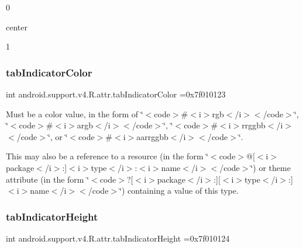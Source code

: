 0

{\ttfamily center}

1\mbox{\label{classandroid_1_1support_1_1v4_1_1R_1_1attr_a75cc391c8e9b6a17ccd48f0d7c092d01}} 
\subsubsection{\texorpdfstring{tab\+Indicator\+Color}{tabIndicatorColor}}
{\footnotesize\ttfamily int android.\+support.\+v4.\+R.\+attr.\+tab\+Indicator\+Color =0x7f010123\hspace{0.3cm}{\ttfamily [static]}}

Must be a color value, in the form of \char`\"{}$<$code$>$\#$<$i$>$rgb$<$/i$>$$<$/code$>$\char`\"{}, \char`\"{}$<$code$>$\#$<$i$>$argb$<$/i$>$$<$/code$>$\char`\"{}, \char`\"{}$<$code$>$\#$<$i$>$rrggbb$<$/i$>$$<$/code$>$\char`\"{}, or \char`\"{}$<$code$>$\#$<$i$>$aarrggbb$<$/i$>$$<$/code$>$\char`\"{}. 

This may also be a reference to a resource (in the form \char`\"{}$<$code$>$@\mbox{[}$<$i$>$package$<$/i$>$\+:\mbox{]}$<$i$>$type$<$/i$>$\+:$<$i$>$name$<$/i$>$$<$/code$>$\char`\"{}) or theme attribute (in the form \char`\"{}$<$code$>$?\mbox{[}$<$i$>$package$<$/i$>$\+:\mbox{]}\mbox{[}$<$i$>$type$<$/i$>$\+:\mbox{]}$<$i$>$name$<$/i$>$$<$/code$>$\char`\"{}) containing a value of this type. \mbox{\label{classandroid_1_1support_1_1v4_1_1R_1_1attr_a74c5fb6adf86e709c57704f21e358c75}} 
\subsubsection{\texorpdfstring{tab\+Indicator\+Height}{tabIndicatorHeight}}
{\footnotesize\ttfamily int android.\+support.\+v4.\+R.\+attr.\+tab\+Indicator\+Height =0x7f010124\hspace{0.3cm}{\ttfamily [static]}}

